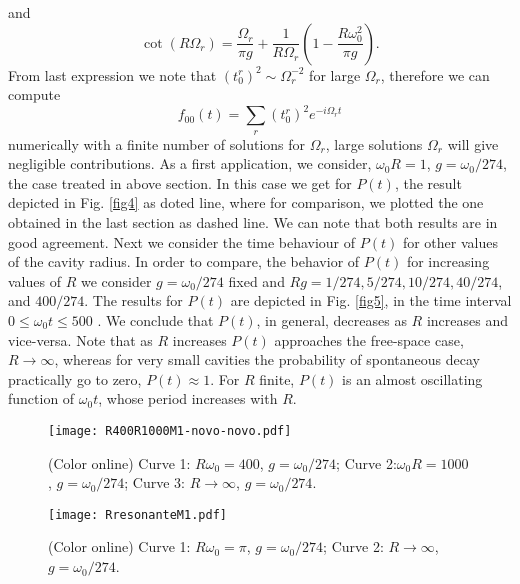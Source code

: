 \documentclass[10pt,english,twocolumn]{revtex4}
\begin{document}
%
and
%
\begin{equation}
\cot(R\Omega_r)=\frac{\Omega_r}{\pi g}+\frac{1}{R\Omega_r}\left(1-\frac{R\omega_0^2}{\pi g}\right).
\label{num2}
\end{equation}
From last expression we note that $(t_0^r)^2\sim \Omega_r^{-2}$ for large $\Omega_r$, therefore we can compute
\begin{equation}
f_{00}(t)=\sum_{r}(t_0^r)^2 e^{-i\Omega_r t}
\label{num3}
\end{equation}
%
numerically with a finite number of solutions for $\Omega_r$, large solutions $\Omega_r$ will give negligible
contributions. As a first application, we consider, $\omega_0 R=1$, $g=\omega_0/274$, the case treated in above section.
In this case we get for $P(t)$, the result depicted in Fig. \ref{fig4} as doted line, where 
for comparison,  we plotted the one obtained in the last section as dashed line. We can note that both results are in good agreement.
Next we consider the time behaviour of $P(t)$ for other values of the cavity radius.    In order to compare, the behavior of $P(t)$ for 
increasing values of $R$ we consider $g=\omega_0/274$ fixed and
$Rg=1/274, 5/274,10/274,40/274$, and $ 400/274$. The results for $P(t)$  are depicted in Fig. \ref{fig5}, in the time interval 
$0\leq \omega_0t\leq 500$ . We conclude that $P(t)$, in general, decreases as $R$ increases and vice-versa.
Note that as $R$ increases $P(t)$ approaches the free-space case, $R\to\infty$, whereas for very small cavities the probability of spontaneous
decay practically go to zero, $P(t)\approx 1$. For $R$ finite, $P(t)$  is an  almost oscillating  function of $\omega_0 t$, whose  period increases
with $R$. 
\begin{figure}[b!]
\texttt{[image: R400R1000M1-novo-novo.pdf]}
 \caption{(Color online) Curve 1: $R\omega_0=400$, $g=\omega_0/274$;
 Curve 2:$\omega_0 R=1000$, $g=\omega_0/274$; Curve 3: $R\rightarrow\infty$, $g=\omega_0/274$. }
\label{fig6} 
\end{figure} 
\begin{figure}[b!]
\texttt{[image: RresonanteM1.pdf]}
 \caption{(Color online) Curve 1: $R\omega_0=\pi$, $g=\omega_0/274$;
 Curve 2: $R\to \infty$, $g=\omega_0/274$. }
\label{fig7} 
\end{figure} 
\end{document}

